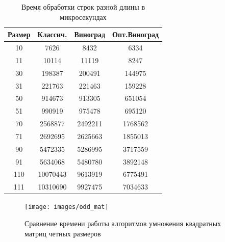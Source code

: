 \documentclass[12pt]{report}
\begin{document}
    \begin{table}[h]
        \begin{center}
            \captionsetup{justification=raggedleft, singlelinecheck=false}
            \caption{\label{time} Время обработки строк разной длины в микросекундах}
            \begin{tabular}{|c c c c|}
                \hline
                Размер & Классич. & Виноград & Опт.Виноград\\ [0.5ex]
                \hline
                10     & 7626     & 8432     & 6334         \\
                \hline
                11     & 10114    & 11119    & 8247         \\
                \hline
                30     & 198387   & 200491   & 144975       \\
                \hline
                31     & 221763   & 221463   & 159228       \\
                \hline
                50     & 914673   & 913305   & 651054       \\
                \hline
                51     & 990919   & 975478   & 695120       \\
                \hline
                70     & 2568877  & 2492211  & 1768562      \\
                \hline
                71     & 2692695  & 2625663  & 1855013      \\
                \hline
                90     & 5472335  & 5286995  & 3717559      \\
                \hline
                91     & 5634068  & 5480780  & 3892148      \\
                \hline
                110    & 10070443 & 9613919  & 6775491      \\
                \hline
                111    & 10310690 & 9927475  & 7034633      \\
                \hline
            \end{tabular}
        \end{center}
    \end{table}

    \begin{figure}[H]
        \centering
        \texttt{[image: images/odd\_mat]}
        \caption{Сравнение времени работы алгоритмов умножения квадратных матриц четных размеров}
        \label{fig:odd_graph}
    \end{figure}
\end{document}
